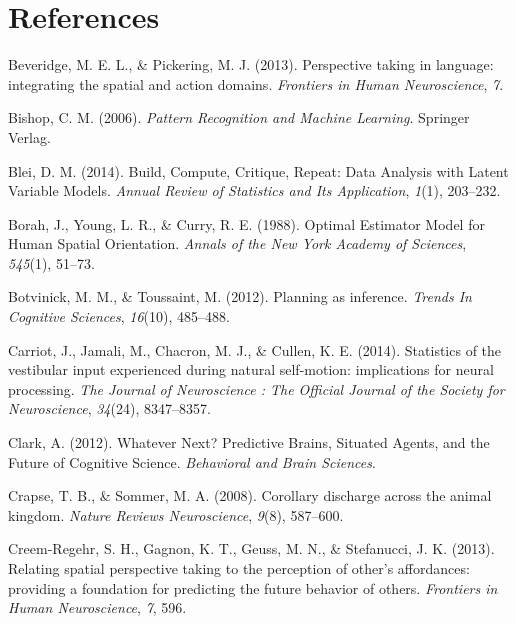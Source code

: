 \documentclass[english,floatsintext,man]{apa6}
\theoremstyle{definition}
\theoremstyle{definition}
\theoremstyle{remark}
\begin{document}
\newpage

\section{References}\label{references}

\setlength{\parindent}{-0.5in} \setlength{\leftskip}{0.5in}

\hypertarget{refs}{}
\hypertarget{ref-Beveridge:2013gx}{}
Beveridge, M. E. L., \& Pickering, M. J. (2013). Perspective taking in
language: integrating the spatial and action domains. \emph{Frontiers in
Human Neuroscience}, \emph{7}.

\hypertarget{ref-Bishop:2006ui}{}
Bishop, C. M. (2006). \emph{Pattern Recognition and Machine Learning}.
Springer Verlag.

\hypertarget{ref-Blei:2014cp}{}
Blei, D. M. (2014). Build, Compute, Critique, Repeat: Data Analysis with
Latent Variable Models. \emph{Annual Review of Statistics and Its
Application}, \emph{1}(1), 203--232.

\hypertarget{ref-Borah:1988fd}{}
Borah, J., Young, L. R., \& Curry, R. E. (1988). Optimal Estimator Model
for Human Spatial Orientation. \emph{Annals of the New York Academy of
Sciences}, \emph{545}(1), 51--73.

\hypertarget{ref-Botvinick:2012fe}{}
Botvinick, M. M., \& Toussaint, M. (2012). Planning as inference.
\emph{Trends In Cognitive Sciences}, \emph{16}(10), 485--488.

\hypertarget{ref-Carriot:2014fv}{}
Carriot, J., Jamali, M., Chacron, M. J., \& Cullen, K. E. (2014).
Statistics of the vestibular input experienced during natural
self-motion: implications for neural processing. \emph{The Journal of
Neuroscience : The Official Journal of the Society for Neuroscience},
\emph{34}(24), 8347--8357.

\hypertarget{ref-Clark:2012vf}{}
Clark, A. (2012). Whatever Next? Predictive Brains, Situated Agents, and
the Future of Cognitive Science. \emph{Behavioral and Brain Sciences}.

\hypertarget{ref-Crapse:2008jc}{}
Crapse, T. B., \& Sommer, M. A. (2008). Corollary discharge across the
animal kingdom. \emph{Nature Reviews Neuroscience}, \emph{9}(8),
587--600.

\hypertarget{ref-CreemRegehr:2013kx}{}
Creem-Regehr, S. H., Gagnon, K. T., Geuss, M. N., \& Stefanucci, J. K.
(2013). Relating spatial perspective taking to the perception of other's
affordances: providing a foundation for predicting the future behavior
of others. \emph{Frontiers in Human Neuroscience}, \emph{7}, 596.
\end{document}
